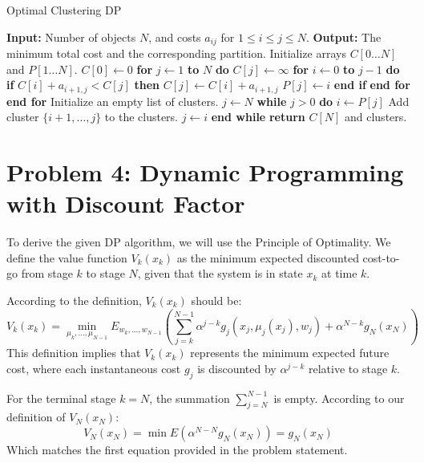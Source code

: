 \documentclass[11pt, a4paper, oneside]{memoir}
\begin{document}
\begin{algorithm}[H]
  \caption{Optimal Clustering DP}
  \label{alg:clustering}
  \begin{algorithmic}[1]
  \STATE \textbf{Input:} Number of objects $N$, and costs $a_{ij}$ for $1 \le i \le j \le N$.
  \STATE \textbf{Output:} The minimum total cost and the corresponding partition.
  \STATE Initialize arrays $C[0 \dots N]$ and $P[1 \dots N]$.
  \STATE $C[0] \leftarrow 0$
  \STATE \textbf{for} $j \leftarrow 1$ \textbf{to} $N$ \textbf{do}
  \STATE \quad $C[j] \leftarrow \infty$
  \STATE \quad \textbf{for} $i \leftarrow 0$ \textbf{to} $j-1$ \textbf{do}
  \STATE \quad \quad \textbf{if} $C[i] + a_{i+1, j} < C[j]$ \textbf{then}
  \STATE \quad \quad \quad $C[j] \leftarrow C[i] + a_{i+1, j}$
  \STATE \quad \quad \quad $P[j] \leftarrow i$
  \STATE \quad \quad \textbf{end if}
  \STATE \quad \textbf{end for}
  \STATE \textbf{end for}
  \STATE {}
  \STATE Initialize an empty list of clusters.
  \STATE $j \leftarrow N$
  \STATE \textbf{while} $j > 0$ \textbf{do}
  \STATE \quad $i \leftarrow P[j]$
  \STATE \quad Add cluster $\{i+1, \dots, j\}$ to the clusters.
  \STATE \quad $j \leftarrow i$
  \STATE \textbf{end while}
  \STATE \textbf{return} $C[N]$ and clusters.
  \end{algorithmic}
\end{algorithm}

\chapter{Problem 4: Dynamic Programming with Discount Factor}
To derive the given DP algorithm, we will use the Principle of Optimality.
We define the value function $V_k(x_k)$ as the minimum expected discounted cost-to-go from stage $k$ to stage $N$,
given that the system is in state $x_k$ at time $k$.

According to the definition, $V_k(x_k)$ should be:
\[ V_k(x_k) = \min_{\mu_k, \dots, \mu_{N-1}} E_{w_k, \dots, w_{N-1}} \left( \sum_{j=k}^{N-1} \alpha^{j-k} g_j(x_j, \mu_j(x_j), w_j) + \alpha^{N-k} g_N(x_N) \right) \]
This definition implies that $V_k(x_k)$ represents the minimum expected future cost,
where each instantaneous cost $g_j$ is discounted by $\alpha^{j-k}$ relative to stage $k$.

For the terminal stage $k=N$, the summation $\sum_{j=N}^{N-1}$ is empty. According to our definition of $V_N(x_N)$:
\[ V_N(x_N) = \min E \left( \alpha^{N-N} g_N(x_N) \right) = g_N(x_N) \]
Which matches the first equation provided in the problem statement.
\end{document}
